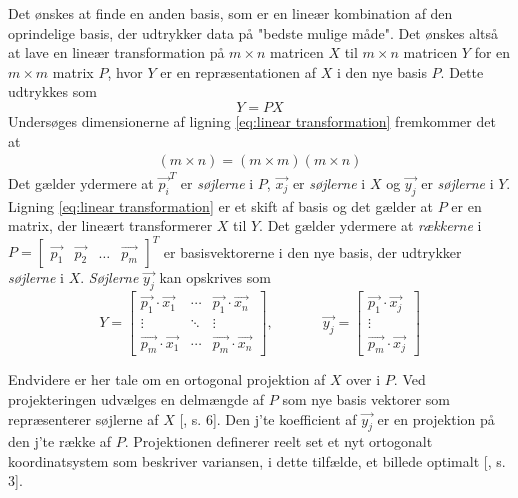 Det ønskes at finde en anden basis, som er en lineær kombination af den oprindelige basis, der udtrykker data på "bedste mulige måde". Det ønskes altså at lave en lineær transformation på $m \times n$ matricen $X$ til $m \times n$ matricen $Y$ for en $m \times m$ matrix $P$, hvor $Y$ er en repræsentationen af $X$ i den nye basis $P$. Dette udtrykkes som
\begin{equation}
Y=PX
\label{eq:linear transformation}
\end{equation}
Undersøges dimensionerne af ligning \vref{eq:linear transformation} fremkommer det at
\begin{align}
(m \times n) = (m \times m)(m \times n)
\end{align}
Det gælder ydermere at ${\vec{p_{i}}}^T$ er \emph{søjlerne} i $P$, $\vec{x_{j}}$ er \emph{søjlerne} i $X$ og $\vec{y_{j}}$ er \emph{søjlerne} i $Y$. Ligning \ref{eq:linear transformation} er et skift af basis og det gælder at $P$ er en matrix, der lineært transformerer $X$ til $Y$. Det gælder ydermere at \emph{rækkerne} i $P = \begin{bmatrix} \vec{p_{1}} & \vec{p_{2}} & \hdots & \vec{p_{m}} \end{bmatrix}^T$ er basisvektorerne i den nye basis, der udtrykker \emph{søjlerne} i $X$.
\emph{Søjlerne} $\vec{y_{j}}$ kan opskrives som
$$ Y = \begin{bmatrix}
\vec{p_1} \cdot \vec{x_1}	& \cdots		&	\vec{p_1} \cdot \vec{x_n}	\\ 
\vdots			& \ddots		&	\vdots			\\ 
\vec{p_m} \cdot \vec{x_1}	& \cdots		&	\vec{p_m} \cdot \vec{x_n}
\end{bmatrix} , \phantom{mmmm} \vec{y_{j}}=\begin{bmatrix} \vec{p_1} \cdot \vec{x_j} \\ \vdots \\ \vec{p_m} \cdot \vec{x_j} \end{bmatrix}$$

Endvidere er her tale om en ortogonal projektion af $X$ over i $P$. 
Ved projekteringen udvælges en delmængde af $P$ som nye basis vektorer som repræsenterer søjlerne af $X$ [\citet{PCA_people}, s. 6]. Den j'te koefficient af $\vec{y_j}$ er en projektion på den j'te række af $P$. Projektionen definerer reelt set et nyt ortogonalt koordinatsystem som beskriver variansen, i dette tilfælde, et billede optimalt [\citet{PCA_slens}, s. 3].


